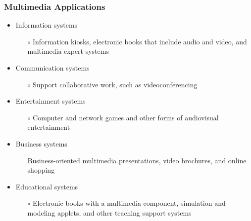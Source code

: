 \documentclass[pdflatex,compress]{beamer}
\begin{document}
\begin{frame}
	\frametitle{Multimedia Applications}
	\begin{itemize}
		\item Information systems
		\begin{itemize}
			\item[$ \circ $] Information kiosks, electronic books that include audio and video, and multimedia expert systems
		\end{itemize}
		\item Communication systems
		\begin{itemize}
			\item[$ \circ $] Support collaborative work, such as videoconferencing
		\end{itemize}
		\item Entertainment systems
		\begin{itemize}
			\item[$ \circ $] Computer and network games and other forms of audiovisual entertainment
		\end{itemize}
		\item Business systems
		\begin{itemize}
			\item[] Business-oriented multimedia presentations, video brochures, and online shopping
		\end{itemize}
		\item Educational systems
		\begin{itemize}
			\item[$ \circ $] Electronic books with a multimedia component, simulation and modeling applets, and other teaching support systems
		\end{itemize}
	\end{itemize}
\end{frame}
\end{document}
